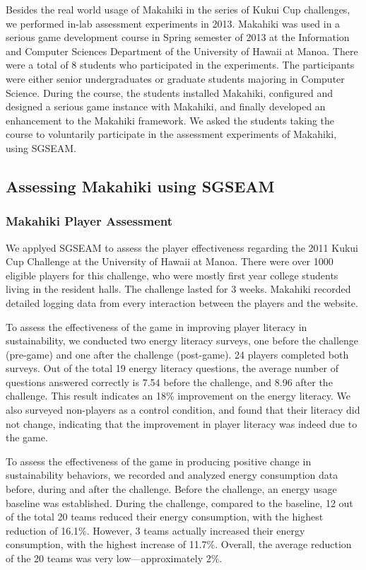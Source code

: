 \documentclass{sigchi}
\begin{document}
Besides the real world usage of Makahiki in the series of Kukui Cup challenges, we
performed in-lab assessment experiments in 2013. Makahiki was used in a serious game
development course in Spring semester of 2013 at the Information and Computer Sciences
Department of the University of Hawaii at Manoa. There were a total of 8 students who
participated in the experiments.  The participants were either senior undergraduates or
graduate students majoring in Computer Science. During the course, the students installed
Makahiki, configured and designed a serious game instance with Makahiki, and finally
developed an enhancement to the Makahiki framework. We asked the students taking the
course to voluntarily participate in the assessment experiments of Makahiki, using SGSEAM.

\subsection{Assessing Makahiki using SGSEAM}

\subsubsection{Makahiki Player Assessment}

We applyed SGSEAM to assess the player effectiveness regarding the 2011 Kukui Cup Challenge at
the University of Hawaii at Manoa. There were over 1000 eligible players for this challenge, who
were mostly first year college students living in the resident halls. The challenge lasted for 3
weeks.  Makahiki recorded detailed logging data from every interaction between the players
and the website.

To assess the effectiveness of the game in improving player literacy in sustainability, we
conducted two energy literacy surveys, one before the challenge (pre-game) and one after
the challenge (post-game). 24 players completed both surveys. Out of the total 19 energy
literacy questions, the average number of questions answered correctly is 7.54 before the
challenge, and 8.96 after the challenge. This result indicates an 18\% improvement on the
energy literacy.  We also surveyed non-players as a control condition, and found that
their literacy did not change, indicating that the improvement in player literacy was
indeed due to the game. 

To assess the effectiveness of the game in producing positive change in sustainability
behaviors, we recorded and analyzed energy consumption data before, during and after the
challenge.  Before the challenge, an energy usage baseline was established. During the
challenge, compared to the baseline, 12 out of the total 20 teams reduced their energy
consumption, with the highest reduction of 16.1\%. However, 3 teams actually increased
their energy consumption, with the highest increase of 11.7\%. Overall, the average
reduction of the 20 teams was very low---approximately 2\%.
\end{document}
